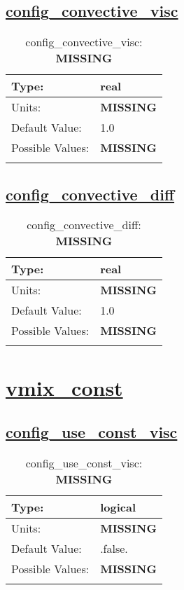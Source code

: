 \subsection[config\_convective\_visc]{\hyperref[sec:nm_tab_vmix]{config\_convective\_visc}}
\label{subsec:nm_sec_config_convective_visc}
\begin{center}
\begin{longtable}{| p{2.0in} | p{4.0in} |}
    \hline
    Type: & real \\
    \hline
    Units: & {\bf \color{red} MISSING} \\
    \hline
    Default Value: & 1.0 \\
    \hline
    Possible Values: & {\bf \color{red} MISSING} \\
    \hline
    \caption{config\_convective\_visc: {\bf \color{red} MISSING}}
\end{longtable}
\end{center}
\subsection[config\_convective\_diff]{\hyperref[sec:nm_tab_vmix]{config\_convective\_diff}}
\label{subsec:nm_sec_config_convective_diff}
\begin{center}
\begin{longtable}{| p{2.0in} | p{4.0in} |}
    \hline
    Type: & real \\
    \hline
    Units: & {\bf \color{red} MISSING} \\
    \hline
    Default Value: & 1.0 \\
    \hline
    Possible Values: & {\bf \color{red} MISSING} \\
    \hline
    \caption{config\_convective\_diff: {\bf \color{red} MISSING}}
\end{longtable}
\end{center}
\section[vmix\_const]{\hyperref[sec:nm_tab_vmix_const]{vmix\_const}}
\label{sec:nm_sec_vmix_const}
\subsection[config\_use\_const\_visc]{\hyperref[sec:nm_tab_vmix_const]{config\_use\_const\_visc}}
\label{subsec:nm_sec_config_use_const_visc}
\begin{center}
\begin{longtable}{| p{2.0in} | p{4.0in} |}
    \hline
    Type: & logical \\
    \hline
    Units: & {\bf \color{red} MISSING} \\
    \hline
    Default Value: & .false. \\
    \hline
    Possible Values: & {\bf \color{red} MISSING} \\
    \hline
    \caption{config\_use\_const\_visc: {\bf \color{red} MISSING}}
\end{longtable}
\end{center}
